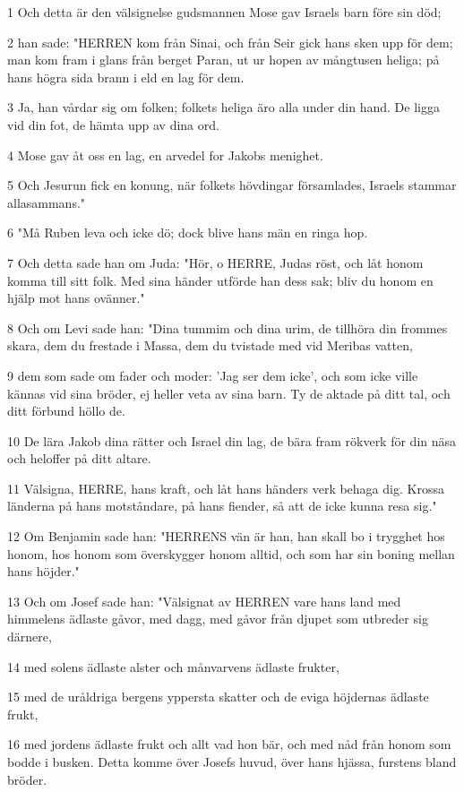 \par 1 Och detta är den välsignelse gudsmannen Mose gav Israels barn före sin död;
\par 2 han sade: "HERREN kom från Sinai, och från Seir gick hans sken upp för dem; man kom fram i glans från berget Paran, ut ur hopen av mångtusen heliga; på hans högra sida brann i eld en lag för dem.
\par 3 Ja, han vårdar sig om folken; folkets heliga äro alla under din hand. De ligga vid din fot, de hämta upp av dina ord.
\par 4 Mose gav åt oss en lag, en arvedel for Jakobs menighet.
\par 5 Och Jesurun fick en konung, när folkets hövdingar församlades, Israels stammar allasammans."
\par 6 "Må Ruben leva och icke dö; dock blive hans män en ringa hop.
\par 7 Och detta sade han om Juda: "Hör, o HERRE, Judas röst, och låt honom komma till sitt folk. Med sina händer utförde han dess sak; bliv du honom en hjälp mot hans ovänner."
\par 8 Och om Levi sade han: "Dina tummim och dina urim, de tillhöra din frommes skara, dem du frestade i Massa, dem du tvistade med vid Meribas vatten,
\par 9 dem som sade om fader och moder: 'Jag ser dem icke', och som icke ville kännas vid sina bröder, ej heller veta av sina barn. Ty de aktade på ditt tal, och ditt förbund höllo de.
\par 10 De lära Jakob dina rätter och Israel din lag, de bära fram rökverk för din näsa och heloffer på ditt altare.
\par 11 Välsigna, HERRE, hans kraft, och låt hans händers verk behaga dig. Krossa länderna på hans motståndare, på hans fiender, så att de icke kunna resa sig."
\par 12 Om Benjamin sade han: "HERRENS vän är han, han skall bo i trygghet hos honom, hos honom som överskygger honom alltid, och som har sin boning mellan hans höjder."
\par 13 Och om Josef sade han: "Välsignat av HERREN vare hans land med himmelens ädlaste gåvor, med dagg, med gåvor från djupet som utbreder sig därnere,
\par 14 med solens ädlaste alster och månvarvens ädlaste frukter,
\par 15 med de uråldriga bergens yppersta skatter och de eviga höjdernas ädlaste frukt,
\par 16 med jordens ädlaste frukt och allt vad hon bär, och med nåd från honom som bodde i busken. Detta komme över Josefs huvud, över hans hjässa, furstens bland bröder.
